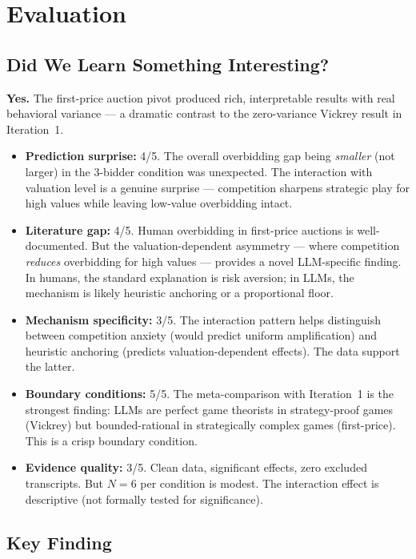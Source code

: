 \documentclass[11pt]{article}
\begin{document}
\section*{Evaluation}

\subsection*{Did We Learn Something Interesting?}

\textbf{Yes.} The first-price auction pivot produced rich, interpretable results with real behavioral variance --- a dramatic contrast to the zero-variance Vickrey result in Iteration~1.

\begin{itemize}
    \item \textbf{Prediction surprise:} 4/5. The overall overbidding gap being \emph{smaller} (not larger) in the 3-bidder condition was unexpected. The interaction with valuation level is a genuine surprise --- competition sharpens strategic play for high values while leaving low-value overbidding intact.
    \item \textbf{Literature gap:} 4/5. Human overbidding in first-price auctions is well-documented. But the valuation-dependent asymmetry --- where competition \emph{reduces} overbidding for high values --- provides a novel LLM-specific finding. In humans, the standard explanation is risk aversion; in LLMs, the mechanism is likely heuristic anchoring or a proportional floor.
    \item \textbf{Mechanism specificity:} 3/5. The interaction pattern helps distinguish between competition anxiety (would predict uniform amplification) and heuristic anchoring (predicts valuation-dependent effects). The data support the latter.
    \item \textbf{Boundary conditions:} 5/5. The meta-comparison with Iteration~1 is the strongest finding: LLMs are perfect game theorists in strategy-proof games (Vickrey) but bounded-rational in strategically complex games (first-price). This is a crisp boundary condition.
    \item \textbf{Evidence quality:} 3/5. Clean data, significant effects, zero excluded transcripts. But $N = 6$ per condition is modest. The interaction effect is descriptive (not formally tested for significance).
\end{itemize}

\subsection*{Key Finding}
\end{document}
